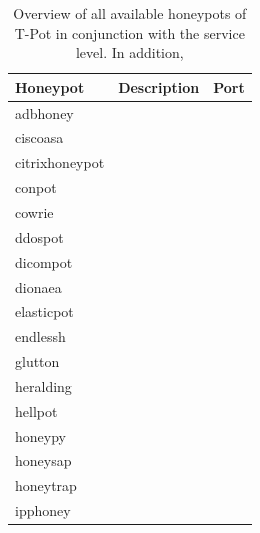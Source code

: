 \begin{table}[h]
    \centering
    \caption[Overview honeypots of T-Pot]{Overview of all available honeypots of T-Pot in conjunction with the service level. In addition, }
    \begin{tabularx}{\linewidth}{l|l|l}
        \toprule
        \textbf{Honeypot}                        & \textbf{Description} & \textbf{Port} \\
        \hline
        adbhoney                                 &                      &               \\
        ciscoasa \cite{cymmetria2018}            &                      &               \\
        citrixhoneypot \cite{citrixhoneypot2020} &                      &               \\
        conpot \cite{conpot2021}                 &                      &               \\
        cowrie \cite{cowire2021}                 &                      &               \\
        ddospot \cite{ddosspot2021}              &                      &               \\
        dicompot \cite{dicompot2021}             &                      &               \\
        dionaea \cite{dionaea2021}               &                      &               \\
        elasticpot \cite{elasticpot2021}         &                      &               \\
        endlessh \cite{endlessh2021}             &                      &               \\
        glutton \cite{glutton2021}               &                      &               \\
        heralding \cite{heralding2021}           &                      &               \\
        hellpot \cite{hellpot2021}               &                      &               \\
        honeypy \cite{honeysap2021}              &                      &               \\
        honeysap \cite{honeysap2021}             &                      &               \\
        honeytrap \cite{honeytrap2021}           &                      &               \\
        ipphoney \cite{ipphoney2021}             &                      &               \\

\end{tabularx}
\end{table}

